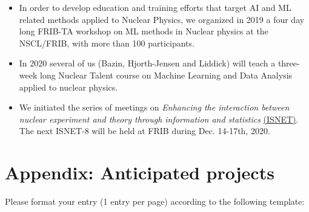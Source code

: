 \documentclass[%
10pt]{article}
\begin{document}
\begin{itemize}

\item In order to develop education and training efforts that target AI and ML related methods applied to Nuclear Physics, we  organized in 2019 a four day long  FRIB-TA workshop on ML methods in Nuclear physics at the NSCL/FRIB, with more than 100 participants.

\item In 2020 several of us (Bazin, Hjorth-Jensen and Liddick) will teach a three-week long Nuclear Talent course on Machine Learning and Data Analysis applied to nuclear physics. 

\item
We initiated the series of meetings on {\it Enhancing the interaction between nuclear experiment and theory through information and statistics} \href{https://iopscience.iop.org/journal/0954-3899/page/ISNET}{(ISNET)}.  The next ISNET-8 will be held at FRIB during  Dec. 14-17th, 2020.

\end{itemize}

\clearpage
\newpage

\section{Appendix: Anticipated projects}

Please format your entry (1 entry per page) according to the following template:

\vspace{5mm}
\noindent
{}
\end{document}
